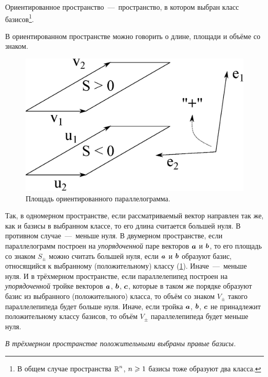 \documentclass[a4paper,12pt]{article}
\begin{document}
  \begin{definition}
    Ориентированное пространство~---~пространство, в котором выбран класс базисов\footnote{В общем случае пространства $\operatorname{\mathbb R}^n$, $n \hm\geq 1$ базисы тоже образуют два класса.}.
  \end{definition}
  
  В ориентированном пространстве можно говорить о длине, площади и объёме со знаком.
  
  \begin{figure}[h]
    \centering
    
    \includegraphics[width=0.5\columnwidth]{two-parallelograms}
    
    \caption{Площадь ориентированного параллелограмма.}
    \label{fig:two-parallelograms}
  \end{figure}
  
  Так, в одномерном пространстве, если рассматриваемый вектор направлен так же, как и базисы в выбранном классе, то его длина считается большей нуля.
  В противном случае~---~меньше нуля.
  В двумерном пространстве, если параллелограмм построен на \emph{упорядоченной} паре векторов $\boldsymbol a$ и $\boldsymbol b$, то его площадь со знаком $S_{\pm}$ можно считать большей нуля, если $\boldsymbol a$ и $\boldsymbol b$ образуют базис, относящийся к выбранному (положительному) классу (\ref{fig:two-parallelograms}).
  Иначе~---~меньше нуля.
  И в трёхмерном пространстве, если параллелепипед построен на \emph{упорядоченной} тройке векторов $\boldsymbol a$, $\boldsymbol b$, $\boldsymbol c$, которые в таком же порядке образуют базис из выбранного (положительного) класса, то объём со знаком $V_{\pm}$ такого параллелепипеда будет больше нуля.
  Иначе, если тройка $\boldsymbol a$, $\boldsymbol b$, $\boldsymbol c$ не принадлежит положительному классу базисов, то объём $V_{\pm}$ параллелепипеда будет меньше нуля.
  
  \emph{В трёхмерном пространстве положительными выбраны правые базисы.}
  
\end{document}
